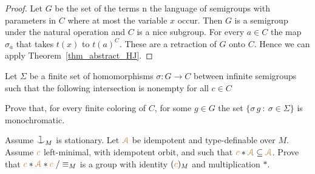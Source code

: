 \begin{proof}
  Let $G$ be the set of the terms n the language of semigroups with parameters in $C$ where at most the variable $x$ occur.
  Then $G$ is a semigroup under the natural operation and $C$ is a nice subgroup.
  For every $a\in C$ the map $\sigma_a$ that takes $t(x)$ to $t(a)^C$.
  These are a retraction of $G$ onto $C$.
  Hence we can apply Theorem~\ref{thm_abstract_HJ}.
\end{proof}

\begin{exercise}\label{thm_hom_HJ}
Let $\Sigma$ be a finite set of homomorphisms $\sigma:G\to C$ 
between infinite semigroups such that the following intersection is nonempty for all $c\in C$


Prove that, for every finite coloring of $C$, for some $g\in G$ the set 
$\{\sigma\,g\ :\ \sigma\in\Sigma\}$ is monochromatic.
\end{exercise}




\begin{exercise}
  Assume $\cnonfork_M$ is stationary.
  Let ${\color{brown}\EuScript A}$ be idempotent and type-definable over $M$.
  Assume ${\color{brown} c}$ left-minimal, with idempotent orbit, and such that ${\color{brown} c}*{\color{brown}\EuScript A}\subseteq{\color{brown}\EuScript A}$.
  Prove that ${\color{brown} c}*{\color{brown}\EuScript A}*{\color{brown} c}\;/\equiv_M$ is a group with identity $({\color{brown} c})_M$ and multiplication $*$.
\end{exercise}


